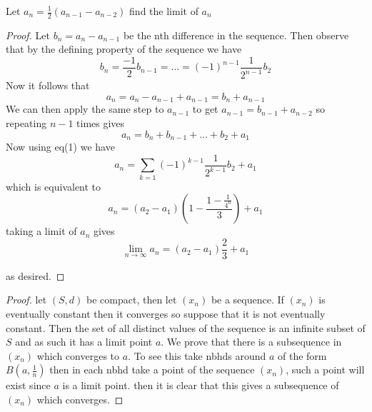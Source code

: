 \documentclass[11pt,largemargins]{homework}
\begin{document}
    \maketitle 

    \question 
    Let $a_n = \frac{1}{2}(a_{n-1} - a_{n - 2})$ find the limit of $a_n$ 

    \begin{proof}
        Let $b_n = a_n - a_{n-1}$ be the nth difference in the sequence. Then observe that by the defining property of the sequence 
        we have 
        \begin{equation}
            b_n = \frac{-1}{2}b_{n-1} = \dots = (-1)^{n-1}\frac{1}{2^{n-1}} b_2
        \end{equation}
        Now it follows that 
        \[a_n = a_n - a_{n-1} + a_{n-1} = b_n + a_{n-1} \]
        We can then apply the same step to $a_{n-1}$ to get $a_{n-1} = b_{n-1} + a_{n-2}$ so repeating $n-1$ times gives 
        \[a_n = b_n + b_{n-1} + \dots + b_2 + a_1\]
        Now using eq(1) we have 
        \[a_n = \sum_{k = 1} (-1)^{k-1} \frac{1}{2^{k-1}} b_2 + a_1\]
        which is equivalent to 
        \[a_n = (a_2 - a_1)(1 - \frac{1 - \frac{1}{4^n}}{3} ) + a_1\]
        taking a limit of $a_n$ gives 
        \[\lim_{n \to \infty} a_n = (a_2 - a_1)\frac{2}{3} + a_1\]

        as desired.
    \end{proof}

    \question

    \begin{proof}
        let $(S, d)$ be compact, then let $(x_n)$ be a sequence. If $(x_n)$ is eventually constant then it converges so suppose 
        that it is not eventually constant. Then the set of all distinct values of the sequence is an infinite subset of $S$ and as such it 
        has a limit point $a$. We prove that there is a subsequence in $(x_n)$ which converges to $a$. To see this take nbhds around $a$ 
        of the form $B(a, \frac{1}{n})$ then in each nbhd take a point of the sequence $(x_n)$, such a point will exist since $a$ is a limit point. 
        then it is clear that this gives a subsequence of $(x_n)$ which converges. 
    \end{proof}

    \question 
\end{document}
